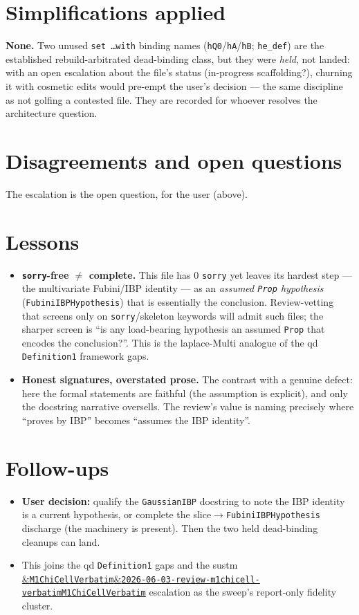 \documentclass[11pt]{article}
\newcommand{\reviewref}[2][]{\href{https://therisensea.org/reviews/#2/}{\ifx&#1&\texttt{#2}\else#1\fi}}
\begin{document}
\section{Simplifications applied}
\textbf{None.} Two unused \texttt{set \dots with} binding names (\texttt{hQ0}/\texttt{hA}/\texttt{hB};
\texttt{he\_def}) are the established rebuild-arbitrated dead-binding class, but they were \emph{held}, not
landed: with an open escalation about the file's status (in-progress scaffolding?), churning it with
cosmetic edits would pre-empt the user's decision --- the same discipline as not golfing a contested file.
They are recorded for whoever resolves the architecture question.

\section{Disagreements and open questions}
The escalation is the open question, for the user (above).

\section{Lessons}
\begin{itemize}[nosep]
  \item \textbf{\texttt{sorry}-free $\ne$ complete.} This file has $0$ \texttt{sorry} yet leaves its hardest
    step --- the multivariate Fubini/IBP identity --- as an \emph{assumed \texttt{Prop} hypothesis}
    (\texttt{FubiniIBPHypothesis}) that is essentially the conclusion. Review-vetting that screens only on
    \texttt{sorry}/skeleton keywords will admit such files; the sharper screen is ``is any load-bearing
    hypothesis an assumed \texttt{Prop} that encodes the conclusion?''. This is the laplace-Multi analogue
    of the qd \texttt{Definition1} framework gaps.
  \item \textbf{Honest signatures, overstated prose.} The contrast with a genuine defect: here the formal
    statements are faithful (the assumption is explicit), and only the docstring narrative oversells. The
    review's value is naming precisely where ``proves by IBP'' becomes ``assumes the IBP identity''.
\end{itemize}

\section{Follow-ups}
\begin{itemize}[nosep]
  \item \textbf{User decision:} qualify the \texttt{GaussianIBP} docstring to note the IBP identity is a
    current hypothesis, or complete the slice$\to$\texttt{FubiniIBPHypothesis} discharge (the machinery is
    present). Then the two held dead-binding cleanups can land.
  \item This joins the qd \texttt{Definition1} gaps and the sustm
    \reviewref[\texttt{M1ChiCellVerbatim}]{2026-06-03-review-m1chicell-verbatim} escalation as the
    sweep's report-only fidelity cluster.
\end{itemize}
\end{document}

